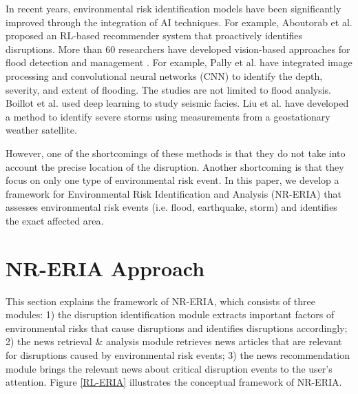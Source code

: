 \documentclass[
]{ceurart}
\begin{document}
In recent years, environmental risk identification models have been significantly improved through the integration of AI techniques. For example, Aboutorab et al. \cite{aboutorab2021reinforcement} proposed an RL-based recommender system that proactively identifies disruptions. More than 60 researchers have developed vision-based approaches for flood detection and management \cite{munawar2021review}. For example, Pally et al. \cite{pally2022application} have integrated image processing and convolutional neural networks (CNN) to identify the depth, severity, and extent of flooding. The studies are not limited to flood analysis. Boillot et al. \cite{boillot2021deep} used deep learning to study seismic facies. Liu et al. \cite{liu2019local} have developed a method to identify severe storms using measurements from a geostationary weather satellite. 

However, one of the shortcomings of these methods is that they do not take into account the precise location of the disruption. Another shortcoming is that they focus on only one type of environmental risk event. In this paper, we develop a framework for Environmental Risk Identification and Analysis (NR-ERIA) that assesses environmental risk events (i.e. flood, earthquake, storm) and identifies the exact affected area.

\section{NR-ERIA Approach}\label{3}

This section explains the framework of NR-ERIA, which consists of three modules: 1) the disruption identification module extracts important factors of environmental risks that cause disruptions and identifies disruptions accordingly; 2) the news retrieval \& analysis module retrieves news articles that are relevant for disruptions caused by environmental risk events; 3) the news recommendation module brings the relevant news about critical disruption events to the user's attention. Figure \ref{RL-ERIA} illustrates the conceptual framework of NR-ERIA.
\end{document}
